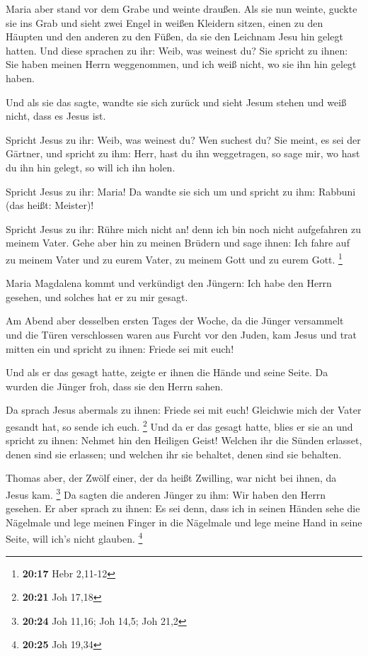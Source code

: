  Maria aber stand vor dem Grabe und weinte draußen. Als sie
nun weinte, guckte sie ins Grab  und sieht zwei Engel in
weißen Kleidern sitzen, einen zu den Häupten und den anderen zu den
Füßen, da sie den Leichnam Jesu hin gelegt hatten.  Und
diese sprachen zu ihr: Weib, was weinest du? Sie spricht zu ihnen: Sie
haben meinen Herrn weggenommen, und ich weiß nicht, wo sie ihn hin
gelegt haben.

 Und als sie das sagte, wandte sie sich zurück und sieht
Jesum stehen und weiß nicht, dass es Jesus ist.

 Spricht Jesus zu ihr: Weib, was weinest du? Wen suchest
du? Sie meint, es sei der Gärtner, und spricht zu ihm: Herr, hast du ihn
weggetragen, so sage mir, wo hast du ihn hin gelegt, so will ich ihn
holen.

 Spricht Jesus zu ihr: Maria! Da wandte sie sich um und
spricht zu ihm: Rabbuni (das heißt: Meister)!

 Spricht Jesus zu ihr: Rühre mich nicht an! denn ich bin
noch nicht aufgefahren zu meinem Vater. Gehe aber hin zu meinen Brüdern
und sage ihnen: Ich fahre auf zu meinem Vater und zu eurem Vater, zu
meinem Gott und zu eurem Gott. \footnote{\textbf{20:17} Hebr 2,11-12}

 Maria Magdalena kommt und verkündigt den Jüngern: Ich habe
den Herrn gesehen, und solches hat er zu mir gesagt.

 Am Abend aber desselben ersten Tages der Woche, da die
Jünger versammelt und die Türen verschlossen waren aus Furcht vor den
Juden, kam Jesus und trat mitten ein und spricht zu ihnen: Friede sei
mit euch!

 Und als er das gesagt hatte, zeigte er ihnen die Hände und
seine Seite. Da wurden die Jünger froh, dass sie den Herrn sahen.

 Da sprach Jesus abermals zu ihnen: Friede sei mit euch!
Gleichwie mich der Vater gesandt hat, so sende ich euch. \footnote{\textbf{20:21}
  Joh 17,18}  Und da er das gesagt hatte, blies er sie an
und spricht zu ihnen: Nehmet hin den Heiligen Geist! 
Welchen ihr die Sünden erlasset, denen sind sie erlassen; und welchen
ihr sie behaltet, denen sind sie behalten.

 Thomas aber, der Zwölf einer, der da heißt Zwilling, war
nicht bei ihnen, da Jesus kam. \footnote{\textbf{20:24} Joh 11,16; Joh
  14,5; Joh 21,2}  Da sagten die anderen Jünger zu ihm: Wir
haben den Herrn gesehen. Er aber sprach zu ihnen: Es sei denn, dass ich
in seinen Händen sehe die Nägelmale und lege meinen Finger in die
Nägelmale und lege meine Hand in seine Seite, will ich's nicht glauben.
\footnote{\textbf{20:25} Joh 19,34}

